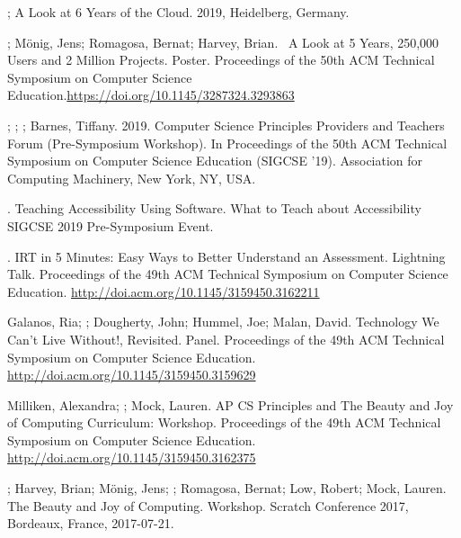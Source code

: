 \begin{etaremune}
    \item{\me; A Look at 6 Years of the \snap{}Cloud. \snapcon{} 2019, Heidelberg, Germany.}
    
    
    \item{\me; Mönig, Jens; Romagosa, Bernat; Harvey, Brian. \snap\ A Look at 5 Years, 250,000 Users and 2 Million Projects. Poster. Proceedings of the 50th ACM Technical Symposium on Computer Science Education.\newline\href{https://doi.org/10.1145/3287324.3293863}{https://doi.org/10.1145/3287324.3293863}}
    
    \item{\lauren; \me; \dan; Barnes, Tiffany. 2019. Computer Science Principles Providers and Teachers Forum (Pre-Symposium Workshop). In Proceedings of the 50th ACM Technical Symposium on Computer Science Education (SIGCSE '19). Association for Computing Machinery, New York, NY, USA.}
    
    \item{\me. Teaching Accessibility Using Software. What to Teach about Accessibility SIGCSE 2019 Pre-Symposium Event.}
    
    \item{\me. IRT in 5 Minutes: Easy Ways to Better Understand an Assessment. Lightning Talk. Proceedings of the 49th ACM Technical Symposium on Computer Science Education.} \href{http://doi.acm.org/10.1145/3159450.3162211}{http://doi.acm.org/10.1145/3159450.3162211}

    \item{Galanos, Ria; \me; Dougherty, John; Hummel, Joe; Malan, David. Technology We Can't Live Without!, Revisited. Panel. Proceedings of the 49th ACM Technical Symposium on Computer Science Education.} \href{http://doi.acm.org/10.1145/3159450.3159629}{http://doi.acm.org/10.1145/3159450.3159629}

    \item{Milliken, Alexandra; \me; Mock, Lauren. AP CS Principles and The Beauty and Joy of Computing Curriculum: Workshop. Proceedings of the 49th ACM Technical Symposium on Computer Science Education.} \href{http://doi.acm.org/10.1145/3159450.3162375}{http://doi.acm.org/10.1145/3159450.3162375}

    
    \item{\dan; Harvey, Brian; Mönig, Jens; \me; Romagosa, Bernat; Low, Robert; Mock, Lauren. The Beauty and Joy of Computing. Workshop. Scratch Conference 2017, Bordeaux, France, 2017-07-21.}


\end{etaremune}
